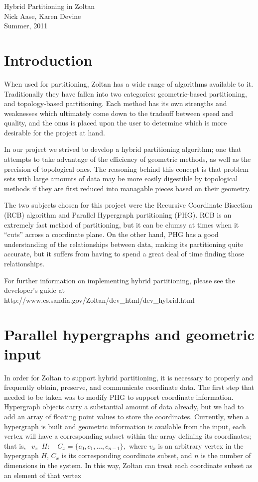 \documentclass[12pt]{article}
\begin{document}
\begin{center}
{\large Hybrid Partitioning in Zoltan} \\
Nick Aase,  Karen Devine \\
Summer, 2011
\end{center}


\section{Introduction}
When used for partitioning, Zoltan has a wide range of algorithms
available to it. Traditionally they have fallen into two categories:
geometric-based partitioning, and topology-based partitioning. Each
method has its own strengths and weaknesses which ultimately come down
to the tradeoff between speed and quality, and the onus is placed
upon the user to determine which is more desirable for the project
at hand.

In our project we strived to develop a hybrid partitioning algorithm;
one that attempts to take advantage of the efficiency of geometric
methods, as well as the precision of topological ones. The reasoning
behind this concept is that problem sets with large amounts of data may
be more easily digestible by topological methods if they are first
reduced into managable pieces based on their geometry.

The two subjects chosen for this project were the Recursive
Coordinate Bisection (RCB) algorithm and Parallel Hypergraph
partitioning (PHG). RCB is an extremely fast method of partitioning,
but it can be clumsy at times when it ``cuts'' across a coordinate plane.
On the other hand, PHG has a good understanding of the relationships
between data, making its partitioning quite accurate, but it suffers
from having to spend a great deal of time finding those relationships.

For further information on implementing hybrid partitioning, please see
the developer's guide at
http://www.cs.sandia.gov/Zoltan/dev\_html/dev\_hybrid.html


\section{Parallel hypergraphs and geometric input}
In order for Zoltan to support hybrid partitioning, it is necessary
to properly and frequently obtain, preserve, and communicate coordinate
data. The first step that needed to be taken was to modify PHG to
support coordinate information. Hypergraph objects carry a substantial
amount of data already, but we had to add an array of floating point
values to store the coordinates. Currently, when a hypergraph is built and
geometric information is available from the input, each vertex will have
a corresponding subset within the array defining its coordinates;
that is, \forall\, $v_x$\in\, $H:$\, \exists\, $C_x =  \{c_0, c_1, ..., c_{n-1}\},$
where $v_x$ is an arbitrary vertex in the hypergraph $H$, $C_x$ is its
corresponding coordinate subset, and $n$ is the number of dimensions in
the system. In this way, Zoltan can treat each coordinate subset as an
element of that vertex
\end{document}
